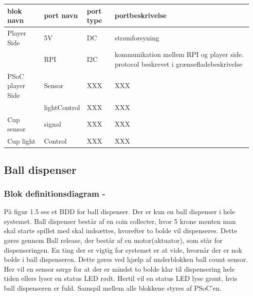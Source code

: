 \documentclass[Arkitektur/System_main.tex]{subfiles}
\begin{document}
\begin{table}[]
\begin{tabular}{|l|l|l|l|}
\hline
blok navn        & port navn    & port type & portbeskrivelse                                                                      \\ \hline
Player Side      & 5V           & DC        & strømforsyning                                                                       \\ \hline
                 & RPI          & I2C       & kommunikation mellem RPI og player side. protocol beskrevet i grænsefladebeskrivelse \\ \hline
PSoC player Side & Sensor       & XXX       & XXX                                                                                  \\ \hline
                 & lightControl & XXX       & XXX                                                                                  \\ \hline
Cup sensor       & signal       & XXX       & XXX                                                                                  \\ \hline
Cup light        & Control      & XXX       & XXX                                                                                  \\ \hline
\end{tabular}
\end{table}

\subsection{Ball dispenser} \label{sec:balldispenser_hardware}
\subsubsection{Blok definitionsdiagram - }

På figur 1.5 ses et BDD for ball dispenser. Der er kun en ball dispenser i hele systemet. Ball dispenser består af en coin collecter, hvor 5 krone mønten man skal starte spillet med skal indsættes, hvorefter to bolde vil dispenseres. Dette gøres gennem Ball release, der består af en motor(aktuator), som står for dispenseringen. En ting der er vigtig for systemet er at vide, hvornår der er nok bolde i ball dispenseren. Dette gøres ved hjælp af underblokken ball count sensor. Her vil en sensor sørge for at der er mindst to bolde klar til dispensering hele tiden ellers lyser en status LED rødt. Hertil vil en status LED lyse grønt, hvis ball dispenseren er fuld. Samspil mellem alle blokkene styres af PSoC'en.
\end{document}
